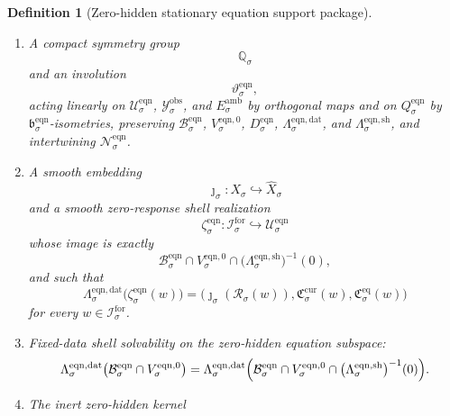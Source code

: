 \documentclass[11pt]{article}
\newcommand{\ForSpace}[1]{\mathcal I_{#1}^{\mathrm{for}}}
\newcommand{\Reduction}[1]{\mathcal R_{#1}}
\newcommand{\CurrentCarrier}[1]{\mathfrak C_{#1}^{\mathrm{cur}}}
\newcommand{\EqCarrier}[1]{\mathfrak C_{#1}^{\mathrm{eq}}}
\newcommand{\VisibleAffine}[1]{\widehat X_{#1}}
\newcommand{\DataSpace}[1]{\mathcal Y_{#1}^{\mathrm{obs}}}
\newcommand{\AmbientTarget}[1]{E_{#1}^{\mathrm{amb}}}
\newcommand{\EqnSpace}[1]{\mathcal U_{#1}^{\mathrm{eqn}}}
\newcommand{\EqnBody}[1]{\mathcal B_{#1}^{\mathrm{eqn}}}
\newcommand{\EqnData}[1]{\Lambda_{#1}^{\mathrm{eqn,dat}}}
\newcommand{\EqnShell}[1]{\Lambda_{#1}^{\mathrm{eqn,sh}}}
\newcommand{\EqnTarget}[1]{Q_{#1}^{\mathrm{eqn}}}
\newcommand{\EqnPair}[1]{\mathfrak b_{#1}^{\mathrm{eqn}}}
\newcommand{\EqnZero}[1]{V_{#1}^{\mathrm{eqn},0}}
\newcommand{\EqnHidden}[1]{H_{#1}^{\mathrm{eqn}}}
\newcommand{\EqnHiddenBody}[1]{D_{#1}^{\mathrm{eqn}}}
\newcommand{\EqnLin}[1]{\mathcal N_{#1}^{\mathrm{eqn}}}
\newcommand{\EqnSym}[1]{\mathbb Q_{#1}}
\newcommand{\EqnTime}[1]{\vartheta_{#1}^{\mathrm{eqn}}}
\newcommand{\EqnEmbed}[1]{\zeta_{#1}^{\mathrm{eqn}}}
\newtheorem{definition}{Definition}
\begin{document}
\begin{definition}[Zero-hidden stationary equation support package]
\begin{enumerate}
    \[
    \EqnLin{\sigma}:\EqnSpace{\sigma}\to\EqnTarget{\sigma}
    \]
    satisfying
    \begin{equation}
    \EqnLin{\sigma}(\delta z)=0
    \qquad
    \text{for all }\delta z\in\EqnZero{\sigma},
    \label{eq:supportzero}
    \end{equation}
    and such that there exists \(\lambda_{\sigma}^{\mathrm{eqn}}>0\) with
    \begin{equation}
    \EqnPair{\sigma}\bigl(\EqnLin{\sigma}\eta,\EqnLin{\sigma}\eta\bigr)
    \ge
    \lambda_{\sigma}^{\mathrm{eqn}}\,
    \|\eta\|^{2}
    \qquad
    \text{for all }\eta\in\EqnHidden{\sigma}.
    \label{eq:supportgap}
    \end{equation}
    \item A compact symmetry group
    \[
    \EqnSym{\sigma}
    \]
    and an involution
    \[
    \EqnTime{\sigma},
    \]
    acting linearly on \(\EqnSpace{\sigma}\), \(\DataSpace{\sigma}\), and \(\AmbientTarget{\sigma}\) by orthogonal maps and on \(\EqnTarget{\sigma}\) by \(\EqnPair{\sigma}\)-isometries, preserving \(\EqnBody{\sigma}\), \(\EqnZero{\sigma}\), \(\EqnHiddenBody{\sigma}\), \(\EqnData{\sigma}\), and \(\EqnShell{\sigma}\), and intertwining \(\EqnLin{\sigma}\).
    \item A smooth embedding
    \[
    \jmath_{\sigma}:X_{\sigma}\hookrightarrow\VisibleAffine{\sigma}
    \]
    and a smooth zero-response shell realization
    \[
    \EqnEmbed{\sigma}:\ForSpace{\sigma}\hookrightarrow\EqnSpace{\sigma}
    \]
    whose image is exactly
    \[
    \EqnBody{\sigma}\cap
    \EqnZero{\sigma}\cap
    \bigl(\EqnShell{\sigma}\bigr)^{-1}(0),
    \]
    and such that
    \begin{equation}
    \EqnData{\sigma}\bigl(\EqnEmbed{\sigma}(w)\bigr)
    =
    \bigl(
    \jmath_{\sigma}(\Reduction{\sigma}(w)),
    \CurrentCarrier{\sigma}(w),
    \EqCarrier{\sigma}(w)
    \bigr)
    \label{eq:supportcompat}
    \end{equation}
    for every \(w\in\ForSpace{\sigma}\).
    \item Fixed-data shell solvability on the zero-hidden equation subspace:
    \begin{equation}
    \EqnData{\sigma}\bigl(
    \EqnBody{\sigma}\cap\EqnZero{\sigma}
    \bigr)
    =
    \EqnData{\sigma}\Bigl(
    \EqnBody{\sigma}\cap
    \EqnZero{\sigma}\cap
    \bigl(\EqnShell{\sigma}\bigr)^{-1}(0)
    \Bigr).
    \label{eq:supportsolvability}
    \end{equation}
    \item The inert zero-hidden kernel

\end{enumerate}
\end{definition}
\end{document}
